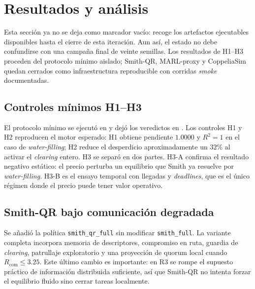 \section{Resultados y análisis}
\label{sec:resultados}

Esta sección ya no se deja como marcador vacío: recoge los artefactos ejecutables
disponibles hasta el cierre de esta iteración. Aun así, el estado no debe confundirse
con una campaña final de veinte semillas. Los resultados de H1--H3 proceden del
protocolo mínimo aislado; Smith-QR, MARL-proxy y CoppeliaSim quedan cerrados como
infraestructura reproducible con corridas \emph{smoke} documentadas.

\subsection{Controles mínimos H1--H3}

El protocolo mínimo se ejecutó en  y dejó los veredictos en
. Los controles H1 y H2 reproducen el motor esperado:
H1 obtiene pendiente $1.0000$ y $R^2=1$ en el caso de \emph{water-filling}; H2 reduce el
desperdicio aproximadamente un $32\%$ al activar el \emph{clearing} entero. H3 se separó
en dos partes. H3-A confirma el resultado negativo estático: el precio perturba un
equilibrio que Smith ya resuelve por \emph{water-filling}. H3-B es el ensayo temporal con
llegadas y \emph{deadlines}, que es el único régimen donde el precio puede tener valor
operativo.

\subsection{Smith-QR bajo comunicación degradada}

Se añadió la política \texttt{smith\_qr\_full} sin modificar \texttt{smith\_full}. La
variante completa incorpora memoria de descriptores, compromiso en ruta, guardia de
\emph{clearing}, patrullaje exploratorio y una proyección de quorum local cuando
$R_{\mathrm{com}}\leq 3.25$. Este último cambio es importante: en R3 se rompe el supuesto
práctico de información distribuida suficiente, así que Smith-QR no intenta forzar el
equilibrio fluido sino cerrar tareas localmente.

